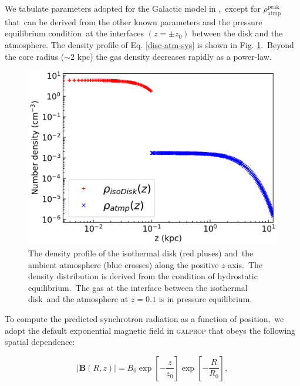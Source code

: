 \documentclass[fleqn,usenatbib,useAMS]{mnras}
\begin{document}
  We tabulate parameters adopted for the Galactic model in ,\
  except for $\rho_{\text{atmp}}^{\text{peak}}$ that\
  can be derived from the other known parameters and the pressure equilibrium condition\
  at the interfaces $(z=\pm z_{0})$ between the disk and the atmosphere. The density profile of Eq. \ref{disc-atm-sys} is shown in Fig. \ref{fig__initial-density-profile}.\
  Beyond the core radius ($\sim 2 \text{ kpc}$) the gas density decreases rapidly as a power-law.


  \begin{figure}
    \includegraphics[width=\columnwidth]{figures/fig__initial-density-profile.png}
    \caption{The density profile of the isothermal disk (red pluses) and\
             the ambient atmosphere (blue crosses) along the positive $z$-axis.\
             The density distribution is derived from the condition of hydrostatic equilibrium.\
             The gas at the interface between the isothermal disk\
             and the atmosphere at $z=0.1$ is in pressure equilibrium.}
    \label{fig__initial-density-profile}
  \end{figure}



  To compute the predicted synchrotron radiation as a function of position,\
  we adopt the default exponential magnetic field in \textsc{galprop} \citep{Strong2007}
  that obeys the following spatial dependence:\

  \begin{equation}
     |\mathbf{B}(R, z)|=B_{0}\exp\left[-\frac{z}{z_{0}}\right]\exp\left[-\frac{R}{R_{0}}\right],
     \label{magnetic-field}
  \end{equation}
\end{document}
